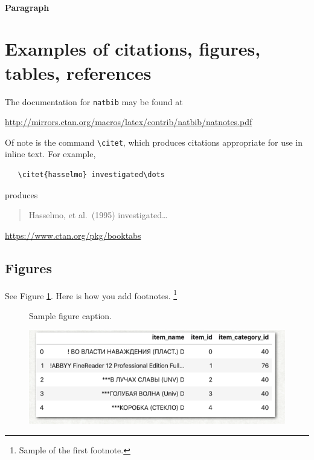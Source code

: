 \documentclass[a4paper]{article}
\begin{document}
\paragraph{Paragraph}


\section{Examples of citations, figures, tables, references}
\label{sec:others}

The documentation for \verb+natbib+ may be found at
\begin{center}
  \url{http://mirrors.ctan.org/macros/latex/contrib/natbib/natnotes.pdf}
\end{center}
Of note is the command \verb+\citet+, which produces citations
appropriate for use in inline text.  For example,
\begin{verbatim}
   \citet{hasselmo} investigated\dots
\end{verbatim}
produces
\begin{quote}
  Hasselmo, et al.\ (1995) investigated\dots
\end{quote}

\begin{center}
  \url{https://www.ctan.org/pkg/booktabs}
\end{center}


\subsection{Figures}

See Figure \ref{fig:fig1}. Here is how you add footnotes. \footnote{Sample of the first footnote.}


\begin{figure}
  \centering
  \fbox{\rule[-.5cm]{4cm}{4cm} \rule[-.5cm]{4cm}{0cm}}
  \caption{Sample figure caption.}
  \label{fig:fig1}
\end{figure}

\begin{figure} %
    \centering
    \includegraphics{test.png}
\end{figure}
\end{document}
